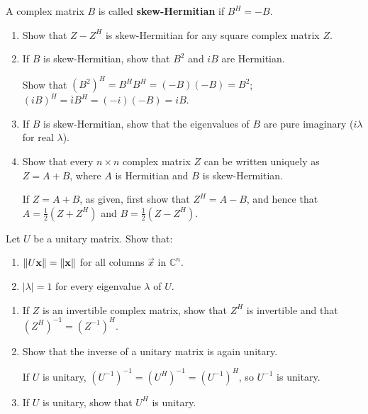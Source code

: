 \documentclass{ximera}
\begin{document}
\begin{problem}\label{prb:complex_matrices14}
A complex matrix $B$ is called \textbf{skew-Hermitian} if $B^{H} = -B$.

\begin{enumerate}[label={\alph*.}]
\item Show that $Z - Z^{H}$ is skew-Hermitian for any square complex matrix $Z$.

\item If $B$ is skew-Hermitian, show that $B^{2}$ and $iB$ are Hermitian.
\begin{hint}
Show that $(B^2)^H = B^HB^H = (-B)(-B) = B^2$; $(iB)^H = \overline{i}B^H = (-i)(-B) = iB$.
\end{hint}

\item If $B$ is skew-Hermitian, show that the eigenvalues of $B$ are pure imaginary ($i \lambda$ for real $\lambda$).

\item Show that every $n \times n$ complex matrix $Z$ can be written uniquely as $Z = A + B$, where $A$ is Hermitian and $B$ is skew-Hermitian.
\begin{hint}
If $Z = A + B$, as given, first show that $Z^{H} = A - B$, and hence that $A = \frac{1}{2}(Z + Z^{H})$ and $B = \frac{1}{2}(Z - Z^{H})$.
\end{hint}
\end{enumerate}
\end{problem}

\begin{problem}\label{prb:complex_matrices15}
Let $U$ be a unitary matrix. Show that:

\begin{enumerate}
\item $\left\lVert U\mathbf{x} \right\rVert = \left\lVert \mathbf{x} \right\rVert$ for all columns $\vec{x}$ in $\mathbb{C}^n$.

\item $|\lambda| = 1$ for every eigenvalue $\lambda$ of $U$.

\end{enumerate}
\end{problem}


\begin{problem}\label{prb:complex_matrices16}
\begin{enumerate}
\item If $Z$ is an invertible complex matrix, show that $Z^{H}$ is invertible and that $(Z^{H})^{-1} = (Z^{-1})^{H}$.

\item Show that the inverse of a unitary matrix is again unitary.
\begin{hint}
If $U$ is unitary, $(U^{-1})^{-1} = (U^{H})^{-1} = (U^{-1})^{H}$, so $U^{-1}$ is unitary.
\end{hint}

\item If $U$ is unitary, show that $U^{H}$ is unitary.

\end{enumerate}
\end{problem}
\end{document}
